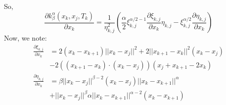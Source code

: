 \documentclass[a4paper, 11pt]{article}
\newcommand{\norm}[1]{||#1||}
\theoremstyle{definition}
\theoremstyle{remark}
\begin{document}
So,
\begin{equation}
    \frac{\partial k_{\beta}^{\alpha} \left( x_k, x_j, T_k \right)}{\partial x_k} =
\frac{1}{\eta_{k,j}^{2}} \left( \frac{\alpha}{2} \xi_{k,j}^{\alpha/2 - 1} \frac{\partial \xi_{k,j}}{\partial x_k} \eta_{k,j} - \xi_{k,j}^{\alpha/2} \frac{\partial \eta_{k,j}}{\partial x_k} \right)
\end{equation}
Now, we note:
\begin{align}
    \frac{\partial \xi_{k,j}}{\partial x_k} &= 2\left( x_k - x_{k+1} \right) \norm{x_k - x_j}^2 + 2 \norm{x_{k+1} - x_k}^2 (x_k - x_j) \nonumber \\
    & -2 \left( \left( x_{k+1} - x_k \right) \cdot \left( x_k - x_j \right) \right) \left( x_j + x_{k+1} - 2 x_k \right) \\
    \frac{\partial \eta_{k,j}}{\partial x_k} &= \beta \norm{x_k - x_j}^{\beta - 2} (x_k - x_j) \norm{x_k - x_{k+1}}^{\alpha} \\
    &+ \norm{x_k - x_j}^{\beta} \alpha \norm{x_k - x_{k+1}}^{\alpha - 2} (x_k - x_{k+1})
\end{align}
\end{document}
